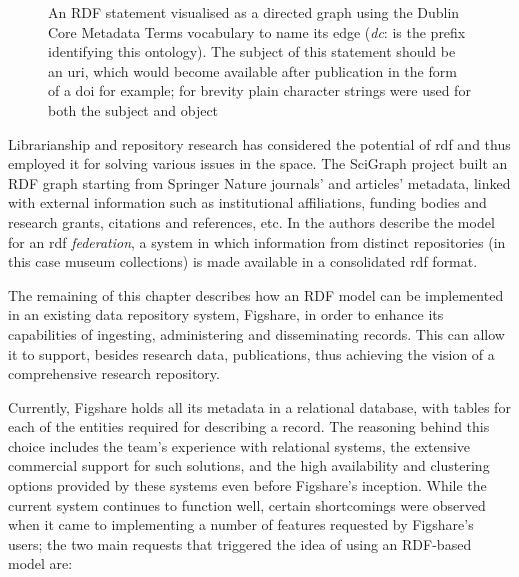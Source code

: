 \begin{figure}[thpb]
  \centering
  \caption{An RDF statement visualised as a directed graph using the Dublin Core Metadata Terms vocabulary to name its edge (\emph{dc}: is the prefix identifying this ontology). The subject of this statement should be an \gls{uri}, which would become available after publication in the form of a \gls{doi} for example; for brevity plain character strings were used for both the subject and object}
  \label{fig:graphinit}
\end{figure}

Librarianship and repository research has considered the potential of \gls{rdf} and thus employed it for solving various issues in the space. The SciGraph project \cite{scigraph} built an RDF graph starting from Springer Nature journals' and articles' metadata, linked with external information such as institutional affiliations, funding bodies and research grants, citations and references, etc.  In \cite{ichim} the authors describe the model for an \gls{rdf} \emph{federation}, a system in which information from distinct repositories (in this case museum collections) is made available in a consolidated \gls{rdf} format.

The remaining of this chapter describes how an RDF model can be implemented in an existing data repository system, Figshare, in order to enhance its capabilities of ingesting, administering and disseminating records. This can allow it to support, besides research data, publications, thus achieving the vision of a comprehensive research repository. 

Currently, Figshare holds all its metadata in a relational database, with tables for each of the entities required for describing a record. The reasoning behind this choice includes the team's experience with relational systems, the extensive commercial support for such solutions, and the high availability and clustering options provided by these systems even before Figshare's inception. While the current system continues to function well, certain shortcomings were observed when it came to implementing a number of features requested by Figshare's users; the two main requests that triggered the idea of using an RDF-based model are:

